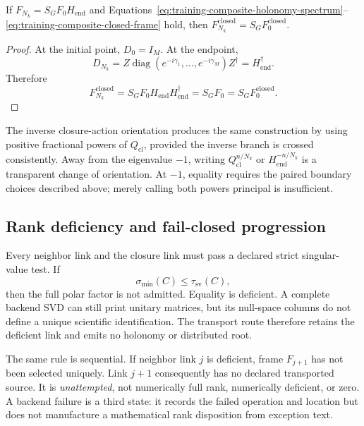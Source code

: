 \begin{proposition}
\label{prop:training-composite-distributed-closure}
If $F_{N_k}=S_GF_0H_{\mathrm{end}}$ and
Equations~\eqref{eq:training-composite-holonomy-spectrum}--\eqref{eq:training-composite-closed-frame}
hold, then
$F_{N_k}^{\mathrm{closed}}=S_GF_0^{\mathrm{closed}}$.
\end{proposition}

\begin{proof}
At the initial point, $D_0=I_M$.  At the endpoint,
\[
  D_{N_k}
  =Z\operatorname{diag}(e^{-i\gamma_1},\ldots,e^{-i\gamma_M})Z^{\dagger}
  =H_{\mathrm{end}}^{\dagger}.
\]
Therefore
\[
  F_{N_k}^{\mathrm{closed}}
  =S_GF_0H_{\mathrm{end}}H_{\mathrm{end}}^{\dagger}
  =S_GF_0
  =S_GF_0^{\mathrm{closed}}.
\]
\end{proof}

The inverse closure-action orientation produces the same construction by using
positive fractional powers of $Q_{\mathrm{cl}}$, provided the inverse branch is
crossed consistently.  Away from the eigenvalue $-1$, writing
$Q_{\mathrm{cl}}^{n/N_k}$ or $H_{\mathrm{end}}^{-n/N_k}$ is a transparent
change of orientation.  At $-1$, equality requires the paired boundary choices
described above; merely calling both powers principal is insufficient.

\subsection{Rank deficiency and fail-closed progression}

Every neighbor link and the closure link must pass a declared strict
singular-value test.  If
\begin{equation}
  \sigma_{\min}(C)\leq\tau_{\mathrm{sv}}(C),
  \label{eq:training-composite-closure-rank-gate}
\end{equation}
then the full polar factor is not admitted.  Equality is deficient.  A complete
backend SVD can still print unitary matrices, but its null-space columns do not
define a unique scientific identification.  The transport route therefore
retains the deficient link and emits no holonomy or distributed root.

The same rule is sequential.  If neighbor link $j$ is deficient, frame
$F_{j+1}$ has not been selected uniquely.  Link $j+1$ consequently has no
declared transported source.  It is \emph{unattempted}, not numerically full
rank, numerically deficient, or zero.  A backend failure is a third state: it
records the failed operation and location but does not manufacture a
mathematical rank disposition from exception text.

